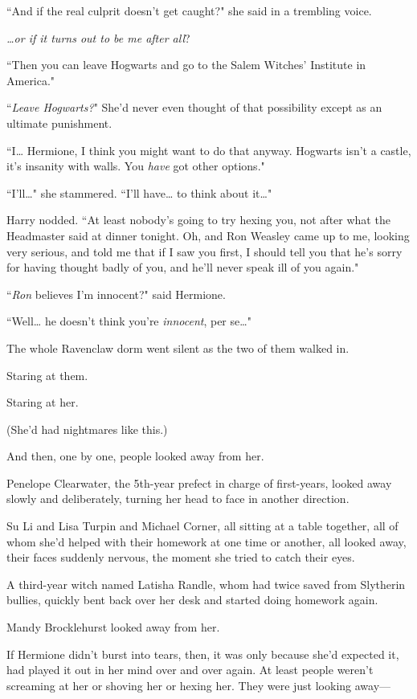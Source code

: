 ``And if the real culprit doesn't get caught?" she said in a trembling voice.

\emph{{\ldots}or if it turns out to be me after all}?

``Then you can leave Hogwarts and go to the Salem Witches' Institute in America."

``\emph{Leave Hogwarts?}" She'd never even thought of that possibility except as an ultimate punishment.

``I{\ldots} Hermione, I think you might want to do that anyway. Hogwarts isn't a castle, it's insanity with walls. You \emph{have} got other options."

``I'll{\ldots}" she stammered. ``I'll have{\ldots} to think about it{\ldots}"

Harry nodded. ``At least nobody's going to try hexing you, not after what the Headmaster said at dinner tonight. Oh, and Ron Weasley came up to me, looking very serious, and told me that if I saw you first, I should tell you that he's sorry for having thought badly of you, and he'll never speak ill of you again."

``\emph{Ron} believes I'm innocent?" said Hermione.

``Well{\ldots} he doesn't think you're \emph{innocent}, per se{\ldots}"

\later

The whole Ravenclaw dorm went silent as the two of them walked in.

Staring at them.

Staring at her.

(She'd had nightmares like this.)

And then, one by one, people looked away from her.

Penelope Clearwater, the 5th-year prefect in charge of first-years, looked away slowly and deliberately, turning her head to face in another direction.

Su Li and Lisa Turpin and Michael Corner, all sitting at a table together, all of whom she'd helped with their homework at one time or another, all looked away, their faces suddenly nervous, the moment she tried to catch their eyes.

A third-year witch named Latisha Randle, whom \SPHEW had twice saved from Slytherin bullies, quickly bent back over her desk and started doing homework again.

Mandy Brocklehurst looked away from her.

If Hermione didn't burst into tears, then, it was only because she'd expected it, had played it out in her mind over and over again. At least people weren't screaming at her or shoving her or hexing her. They were just looking away—

